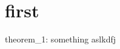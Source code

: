 \documentclass{article}
\begin{document}
\section{first}
theorem_1: something
aslkdfj
\end{document}
